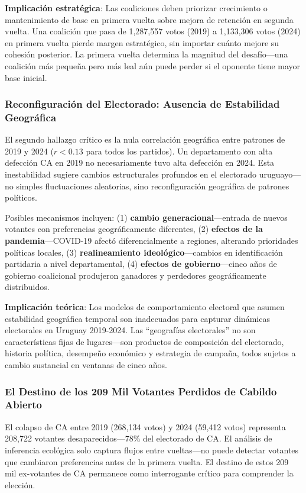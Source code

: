 \textbf{Implicación estratégica}: Las coaliciones deben priorizar crecimiento o mantenimiento de base en primera vuelta sobre mejora de retención en segunda vuelta. Una coalición que pasa de 1,287,557 votos (2019) a 1,133,306 votos (2024) en primera vuelta pierde margen estratégico, sin importar cuánto mejore su cohesión posterior. La primera vuelta determina la magnitud del desafío---una coalición más pequeña pero más leal aún puede perder si el oponente tiene mayor base inicial.

\subsubsection{Reconfiguración del Electorado: Ausencia de Estabilidad Geográfica}

El segundo hallazgo crítico es la nula correlación geográfica entre patrones de 2019 y 2024 ($r < 0.13$ para todos los partidos). Un departamento con alta defección CA en 2019 no necesariamente tuvo alta defección en 2024. Esta inestabilidad sugiere cambios estructurales profundos en el electorado uruguayo---no simples fluctuaciones aleatorias, sino reconfiguración geográfica de patrones políticos.

Posibles mecanismos incluyen: (1) \textbf{cambio generacional}---entrada de nuevos votantes con preferencias geográficamente diferentes, (2) \textbf{efectos de la pandemia}---COVID-19 afectó diferencialmente a regiones, alterando prioridades políticas locales, (3) \textbf{realineamiento ideológico}---cambios en identificación partidaria a nivel departamental, (4) \textbf{efectos de gobierno}---cinco años de gobierno coalicional produjeron ganadores y perdedores geográficamente distribuidos.

\textbf{Implicación teórica}: Los modelos de comportamiento electoral que asumen estabilidad geográfica temporal son inadecuados para capturar dinámicas electorales en Uruguay 2019-2024. Las ``geografías electorales'' no son características fijas de lugares---son productos de composición del electorado, historia política, desempeño económico y estrategia de campaña, todos sujetos a cambio sustancial en ventanas de cinco años.

\subsubsection{El Destino de los 209 Mil Votantes Perdidos de Cabildo Abierto}

El colapso de CA entre 2019 (268,134 votos) y 2024 (59,412 votos) representa 208,722 votantes desaparecidos---78\% del electorado de CA. El análisis de inferencia ecológica solo captura flujos entre vueltas---no puede detectar votantes que cambiaron preferencias antes de la primera vuelta. El destino de estos 209 mil ex-votantes de CA permanece como interrogante crítico para comprender la elección.

